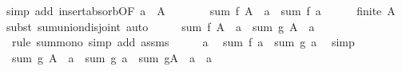 \begin{isabellebody}
{\isacharparenleft}{\kern0pt}simp\ add{\isacharcolon}{\kern0pt}\ insert{\isacharunderscore}{\kern0pt}absorb{\isacharbrackleft}{\kern0pt}OF\ {\isacartoucheopen}a\ {\isasymin}\ A{\isacartoucheclose}{\isacharbrackright}{\kern0pt}{\isacharparenright}{\kern0pt}\isanewline
\ \ \isamarkupfalse%
\ \isamarkupfalse%
\ {\isachardoublequoteopen}{\isasymdots}\ {\isacharequal}{\kern0pt}\ sum\ f\ {\isacharparenleft}{\kern0pt}A\ {\isacharminus}{\kern0pt}\ {\isacharbraceleft}{\kern0pt}a{\isacharbraceright}{\kern0pt}{\isacharparenright}{\kern0pt}\ {\isacharplus}{\kern0pt}\ sum\ f\ {\isacharbraceleft}{\kern0pt}a{\isacharbraceright}{\kern0pt}{\isachardoublequoteclose}\isanewline
\ \ \ \ \isamarkupfalse%
\ {\isacartoucheopen}finite\ A{\isacartoucheclose}\ \isamarkupfalse%
{\isacharparenleft}{\kern0pt}subst\ sum{\isachardot}{\kern0pt}union{\isacharunderscore}{\kern0pt}disjoint{\isacharparenright}{\kern0pt}\ auto\isanewline
\ \ \isamarkupfalse%
\ \isamarkupfalse%
\ {\isachardoublequoteopen}sum\ f\ {\isacharparenleft}{\kern0pt}A\ {\isacharminus}{\kern0pt}\ {\isacharbraceleft}{\kern0pt}a{\isacharbraceright}{\kern0pt}{\isacharparenright}{\kern0pt}\ {\isasymle}\ sum\ g\ {\isacharparenleft}{\kern0pt}A\ {\isacharminus}{\kern0pt}\ {\isacharbraceleft}{\kern0pt}a{\isacharbraceright}{\kern0pt}{\isacharparenright}{\kern0pt}{\isachardoublequoteclose}\isanewline
\ \ \ \ \isamarkupfalse%
\ {\isacharparenleft}{\kern0pt}rule\ sum{\isacharunderscore}{\kern0pt}mono{\isacharparenright}{\kern0pt}\ {\isacharparenleft}{\kern0pt}simp\ add{\isacharcolon}{\kern0pt}\ assms{\isacharparenleft}{\kern0pt}{}{\isacharparenright}{\kern0pt}{\isacharparenright}{\kern0pt}\isanewline
\ \ \isamarkupfalse%
\ \isamarkupfalse%
\ a\ \isamarkupfalse%
\ {\isachardoublequoteopen}sum\ f\ {\isacharbraceleft}{\kern0pt}a{\isacharbraceright}{\kern0pt}\ {\isacharless}{\kern0pt}\ sum\ g\ {\isacharbraceleft}{\kern0pt}a{\isacharbraceright}{\kern0pt}{\isachardoublequoteclose}\ \isamarkupfalse%
\ simp\isanewline
\ \ \isamarkupfalse%
\ \isamarkupfalse%
\ {\isachardoublequoteopen}sum\ g\ {\isacharparenleft}{\kern0pt}A\ {\isacharminus}{\kern0pt}\ {\isacharbraceleft}{\kern0pt}a{\isacharbraceright}{\kern0pt}{\isacharparenright}{\kern0pt}\ {\isacharplus}{\kern0pt}\ sum\ g\ {\isacharbraceleft}{\kern0pt}a{\isacharbraceright}{\kern0pt}\ {\isacharequal}{\kern0pt}\ sum\ g{\isacharparenleft}{\kern0pt}{\isacharparenleft}{\kern0pt}A\ {\isacharminus}{\kern0pt}\ {\isacharbraceleft}{\kern0pt}a{\isacharbraceright}{\kern0pt}{\isacharparenright}{\kern0pt}\ {\isasymunion}\ {\isacharbraceleft}{\kern0pt}a{\isacharbraceright}{\kern0pt}{\isacharparenright}{\kern0pt}{\isachardoublequoteclose}\isanewline

\end{isabellebody}
